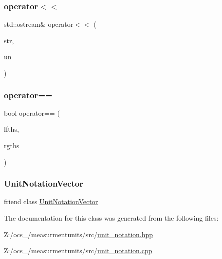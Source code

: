 \subsubsection{\texorpdfstring{operator$<$$<$}{operator<<}}
{\footnotesize\ttfamily std\+::ostream\& operator$<$$<$ (\begin{DoxyParamCaption}\item[{std\+::ostream \&}]{str,  }\item[{const \hyperlink{classmunits_1_1_unit_notation}{Unit\+Notation} \&}]{un }\end{DoxyParamCaption})\hspace{0.3cm}{\ttfamily [friend]}}

\mbox{\label{classmunits_1_1_unit_notation_ab7df41558423a5897c18119d31624f90}} 
\subsubsection{\texorpdfstring{operator==}{operator==}}
{\footnotesize\ttfamily bool operator== (\begin{DoxyParamCaption}\item[{const \hyperlink{classmunits_1_1_unit_notation}{munits\+::\+Unit\+Notation} \&}]{lfths,  }\item[{const \hyperlink{classmunits_1_1_unit_notation}{munits\+::\+Unit\+Notation} \&}]{rgths }\end{DoxyParamCaption})\hspace{0.3cm}{\ttfamily [friend]}}

\mbox{\label{classmunits_1_1_unit_notation_a816f3ddc8b55e7f959db7e1a15ea4619}} 
\subsubsection{\texorpdfstring{Unit\+Notation\+Vector}{UnitNotationVector}}
{\footnotesize\ttfamily friend class \hyperlink{classmunits_1_1_unit_notation_vector}{Unit\+Notation\+Vector}\hspace{0.3cm}{\ttfamily [friend]}}



The documentation for this class was generated from the following files\+:\begin{DoxyCompactItemize}
\item 
Z\+:/ocs\+\_/measurmentunits/src/\hyperlink{unit__notation_8hpp}{unit\+\_\+notation.\+hpp}\item 
Z\+:/ocs\+\_/measurmentunits/src/\hyperlink{unit__notation_8cpp}{unit\+\_\+notation.\+cpp}\end{DoxyCompactItemize}

